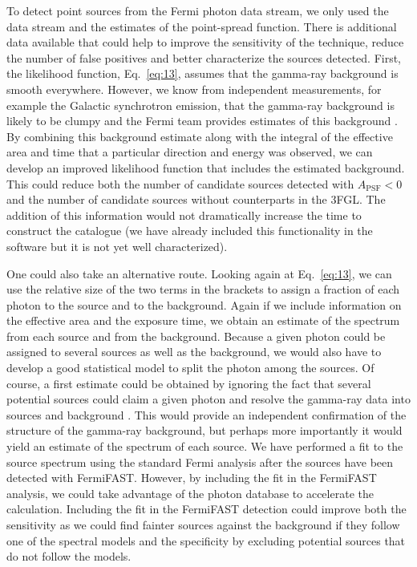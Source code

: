 \documentclass[useAMS,usenatbib]{mn2e}
\begin{document}
To detect point sources from the Fermi photon data stream, we only
used the data stream and the estimates of the point-spread
function. There is additional data available that could help to
improve the sensitivity of the technique, reduce the number of false
positives and better characterize the sources detected.  First, the
likelihood function, Eq.~\ref{eq:13}, assumes that the gamma-ray
background is smooth everywhere.  However, we know from independent
measurements, for example the Galactic synchrotron emission, that the
gamma-ray background is likely to be clumpy and the Fermi team
provides estimates of this background \citep[e.g.][]{Fermi1602.07246}.
By combining this background
estimate along with the integral of the effective area and time that a
particular direction and energy was observed, we can develop an
improved likelihood function that includes the estimated background.
This could reduce both the number of candidate sources detected with
$A_\mathrm{PSF}<0$ and the number of candidate sources without
counterparts in the 3FGL.  The addition of this information would not
dramatically increase the time to construct the catalogue (we have
already included this functionality in the software but it is not yet
well characterized).

One could also take an alternative route.  Looking again at
Eq.~\ref{eq:13}, we can use the relative size of the two terms in the
brackets to assign a fraction of each photon to the source and to the
background.  Again if we include information on the effective area and
the exposure time, we obtain an estimate of the spectrum from each
source and from the background.  Because a given photon could be
assigned to several sources as well as the background, we would also
have to develop a good statistical model to split the photon among the
sources.  Of course, a first estimate could be obtained by ignoring
the fact that several potential sources could claim a given photon and
resolve the gamma-ray data into sources and background \citep[as done
 by][]{2015A&A...581A.126S}. This would provide an independent
confirmation of the structure of the gamma-ray background, but perhaps
more importantly it would yield an estimate of the spectrum of each
source. We have performed a fit to the source spectrum using the
standard Fermi analysis after the sources have been detected with
FermiFAST.  However, by including the fit in the FermiFAST analysis,
we could take advantage of the photon database to accelerate the
calculation.  Including the fit in the FermiFAST detection could
improve both the sensitivity as we could find fainter sources against
the background if they follow one of the spectral models and the
specificity by excluding potential sources that do not follow the
models.
\end{document}
